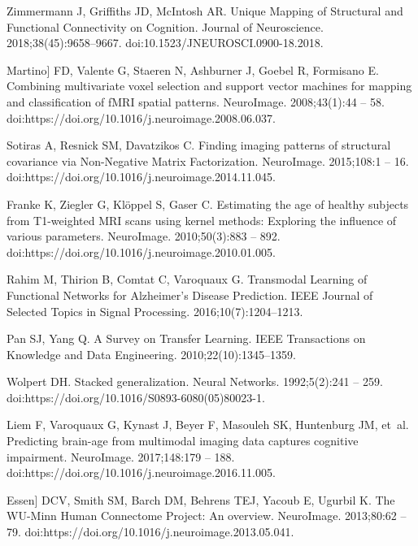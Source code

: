 \documentclass[10pt,letterpaper]{article}
\begin{document}
\begin{thebibliography}{10}
Zimmermann J, Griffiths JD, McIntosh AR.
\newblock Unique Mapping of Structural and Functional Connectivity on
  Cognition.
\newblock Journal of Neuroscience. 2018;38(45):9658--9667.
\newblock doi:{10.1523/JNEUROSCI.0900-18.2018}.

Martino] FD, Valente G, Staeren N, Ashburner J, Goebel R, Formisano E.
\newblock Combining multivariate voxel selection and support vector machines
  for mapping and classification of fMRI spatial patterns.
\newblock NeuroImage. 2008;43(1):44 -- 58.
\newblock doi:{https://doi.org/10.1016/j.neuroimage.2008.06.037}.

Sotiras A, Resnick SM, Davatzikos C.
\newblock Finding imaging patterns of structural covariance via Non-Negative
  Matrix Factorization.
\newblock NeuroImage. 2015;108:1 -- 16.
\newblock doi:{https://doi.org/10.1016/j.neuroimage.2014.11.045}.

Franke K, Ziegler G, Klöppel S, Gaser C.
\newblock Estimating the age of healthy subjects from T1-weighted MRI scans
  using kernel methods: Exploring the influence of various parameters.
\newblock NeuroImage. 2010;50(3):883 -- 892.
\newblock doi:{https://doi.org/10.1016/j.neuroimage.2010.01.005}.

{Rahim} M, {Thirion} B, {Comtat} C, {Varoquaux} G.
\newblock Transmodal Learning of Functional Networks for Alzheimer's Disease
  Prediction.
\newblock IEEE Journal of Selected Topics in Signal Processing.
  2016;10(7):1204--1213.

{Pan} SJ, {Yang} Q.
\newblock A Survey on Transfer Learning.
\newblock IEEE Transactions on Knowledge and Data Engineering.
  2010;22(10):1345--1359.

Wolpert DH.
\newblock Stacked generalization.
\newblock Neural Networks. 1992;5(2):241 -- 259.
\newblock doi:{https://doi.org/10.1016/S0893-6080(05)80023-1}.

Liem F, Varoquaux G, Kynast J, Beyer F, Masouleh SK, Huntenburg JM, et~al.
\newblock Predicting brain-age from multimodal imaging data captures cognitive
  impairment.
\newblock NeuroImage. 2017;148:179 -- 188.
\newblock doi:{https://doi.org/10.1016/j.neuroimage.2016.11.005}.

Essen] DCV, Smith SM, Barch DM, Behrens TEJ, Yacoub E, Ugurbil K.
\newblock The WU-Minn Human Connectome Project: An overview.
\newblock NeuroImage. 2013;80:62 -- 79.
\newblock doi:{https://doi.org/10.1016/j.neuroimage.2013.05.041}.


\end{thebibliography}
\end{document}

